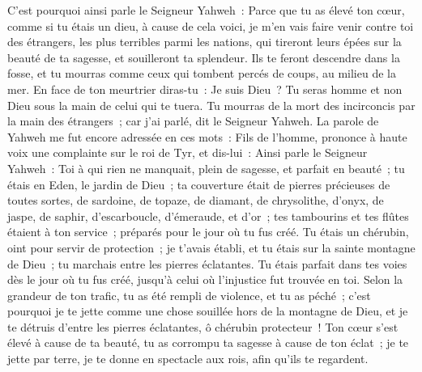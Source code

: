 \begin{multicols}{2}
C'est pourquoi ainsi parle le Seigneur Yahweh~: Parce que tu as élevé ton cœur, comme si tu étais un dieu,
à cause de cela voici, je m'en vais faire venir contre toi des étrangers, les plus terribles parmi les nations, qui tireront leurs épées sur la beauté de ta sagesse, et souilleront ta splendeur.
Ils te feront descendre dans la fosse, et tu mourras comme ceux qui tombent percés de coups, au milieu de la mer.
En face de ton meurtrier diras-tu~: Je suis Dieu~? Tu seras homme et non Dieu sous la main de celui qui te tuera.
Tu mourras de la mort des incirconcis par la main des étrangers~; car j'ai parlé, dit le Seigneur Yahweh.
La parole de Yahweh me fut encore adressée en ces mots~:
Fils de l'homme, prononce à haute voix une complainte sur le roi de Tyr, et dis-lui~: Ainsi parle le Seigneur Yahweh~: Toi à qui rien ne manquait, plein de sagesse, et parfait en beauté~;
tu étais en Eden, le jardin de Dieu~; ta couverture était de pierres précieuses de toutes sortes, de sardoine, de topaze, de diamant, de chrysolithe, d'onyx, de jaspe, de saphir, d'escarboucle, d'émeraude, et d'or~; tes tambourins et tes flûtes étaient à ton service~; préparés pour le jour où tu fus créé.
Tu étais un chérubin, oint pour servir de protection~; je t'avais établi, et tu étais sur la sainte montagne de Dieu~; tu marchais entre les pierres éclatantes.
Tu étais parfait dans tes voies dès le jour où tu fus créé, jusqu'à celui où l'injustice fut trouvée en toi.
Selon la grandeur de ton trafic, tu as été rempli de violence, et tu as péché~; c'est pourquoi je te jette comme une chose souillée hors de la montagne de Dieu, et je te détruis d'entre les pierres éclatantes, ô chérubin protecteur~!
Ton cœur s'est élevé à cause de ta beauté, tu as corrompu ta sagesse à cause de ton éclat~; je te jette par terre, je te donne en spectacle aux rois, afin qu'ils te regardent.

\end{multicols}
